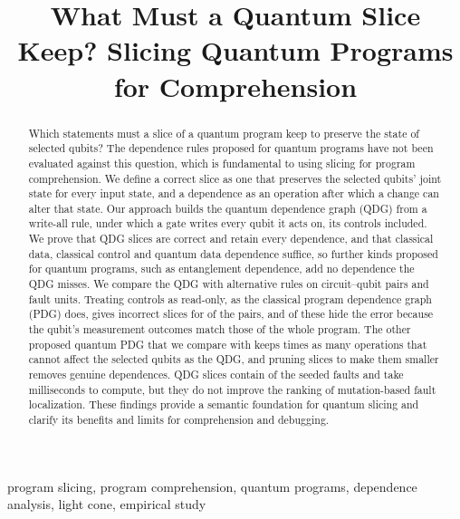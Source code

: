 \documentclass[10pt,conference]{IEEEtran}
\begin{document}
\title{What Must a Quantum Slice Keep? Slicing Quantum Programs for Comprehension}
\author{}
\maketitle

\begin{abstract}
Which statements must a slice of a quantum program keep to preserve the state of selected qubits? The dependence rules
proposed for quantum programs have not been evaluated against this question, which is fundamental to using slicing for
program comprehension. We define a correct slice as one that preserves the selected qubits' joint state for every input
state, and a dependence as an operation after which a change can alter that state. Our approach builds the quantum
dependence graph (QDG) from a write-all rule, under which a gate writes every qubit it acts on, its controls included.
We prove that QDG slices are correct and retain every dependence, and that classical data, classical control and
quantum data dependence suffice, so further kinds proposed for quantum programs, such as entanglement dependence, add
no dependence the QDG misses. We compare the QDG with alternative rules on \numNPairs{} circuit--qubit pairs and
\numStudyFaultUnits{} fault units. Treating controls as read-only, as the classical program dependence graph (PDG) does,
gives incorrect slices for \numCpdgUnsoundPct{} of the pairs, and \numFdCpdgZMatchPct{} of these hide the error because
the qubit's measurement outcomes match those of the whole program. The other proposed quantum PDG that we compare with
keeps \numYzLcExcessRatio{} times as many operations that cannot affect the selected qubits as the QDG, and
pruning slices to make them smaller removes genuine dependences. QDG slices contain \numRqThreeContainLc{} of the seeded
faults and take milliseconds to compute, but they do not improve the ranking of mutation-based fault localization.
These findings provide a semantic foundation for quantum slicing and clarify its benefits and limits for
comprehension and debugging.
\end{abstract}

\begin{IEEEkeywords}
program slicing, program comprehension, quantum programs, dependence analysis, light cone, empirical study
\end{IEEEkeywords}





















\end{document}
